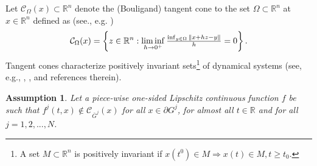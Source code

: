 \documentclass{article}
\newcommand{\R}{\mathbb{R}}
\newtheorem{assumption}{Assumption}
\begin{document}
Let $\mathcal{C}_{\Omega}(x)\subset \R^n$ denote the (Bouligand)  tangent cone to the set $\Omega\subset \R^n$ at $x\in \R^n$ defined as (see., e.g. \cite{Nagumno1942:PPMSJ}) \vspace{-1mm}
	\begin{equation}
		\mathcal{C}_{\Omega}(x)=\left\{z\in \R^n: \liminf_{h\to 0^+}\tfrac{\inf_{y\in \Omega}\|x+hz-y\|}{h}=0 \right\}.\vspace{-1mm}
	\end{equation}
Tangent cones characterize positively invariant sets\footnote{A set $M\!\subset\! \R^n$ is positively invariant if $x(t^0)\!\in\! M \Rightarrow x(t)\!\in\! M,t\!\geq\! t_0.$ } of dynamical systems (see, e.g., \cite{Clarke_etal1995:JDCS}, \cite{Blanchini1999:Aut}, \cite{AubinEkeland1984:Book} and references therein). 
\begin{assumption}\label{as:uniq_1}\itshape
	Let  a piece-wise one-sided Lipschitz continuous function $f$ be such that 
		$f^j(t,x)\!\notin\! \mathcal{C}_{\bar G^j}(x)$ for all  $x\!\in\! \partial G^j$,
		for almost all $t\!\in\!\R$ and  for all $j\!=\!1,2,...,N$.
\end{assumption}
\end{document}
